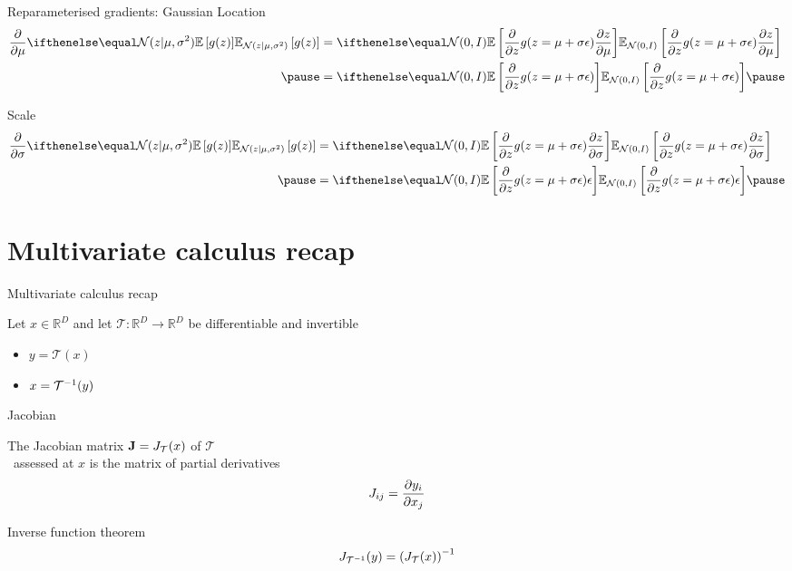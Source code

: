\documentclass[14pt]{beamer}
\begin{document}
\begin{frame}{Reparameterised gradients: Gaussian}
	Location
	\begin{equation*}
	\begin{aligned}
		\pdv{\mu} \E[\mathcal N(z|\mu, \sigma^2)]{ g(z) }
			&= \E[\mathcal N(0, I)]{\pdv{z} g(z = \mu + \sigma  \epsilon) \pdv{z}{\mu}} \\ \pause
		&= \E[\mathcal N(0, I)]{\pdv{z} g(z = \mu + \sigma  \epsilon)} \pause
	\end{aligned}
	\end{equation*}
	
	Scale
	\begin{equation*}
	\begin{aligned}
		\pdv{\sigma} \E[\mathcal N(z|\mu, \sigma^2)]{ g(z) } &= \E[\mathcal N(0, I)]{\pdv{z} g(z = \mu + \sigma  \epsilon) \pdv{z}{\sigma}} \\ \pause
		&= \E[\mathcal N(0, I)]{\pdv{z} g(z = \mu + \sigma  \epsilon)  \epsilon} \pause
	\end{aligned}
	\end{equation*}
	
\end{frame}

\section{Multivariate calculus recap}

\begin{frame}{Multivariate calculus recap}

Let $x \in \mathbb R^D$ and let $\mathcal T: \mathbb R^D \to \mathbb R^D$ be differentiable and invertible
\begin{itemize}
	\item $y = \mathcal T(x)$
	\item $x = {\mathcal T}^{-1}(y)$
\end{itemize}

\end{frame}

\begin{frame}{Jacobian}

	The Jacobian matrix $\mathbf J = J_{\mathcal T}(x) $ of  $\mathcal T$ \\
	~assessed at $x$ is the matrix of partial derivatives
	\begin{equation*}
		J_{ij} = \pdv{y_i}{x_j} 
	\end{equation*} 
	
	\pause
	Inverse function theorem
	\begin{equation*}
		J_{{\mathcal T}^{-1}}(y) = \left( J_{\mathcal T}(x) \right)^{-1}
	\end{equation*}
	
\end{frame}
\end{document}
